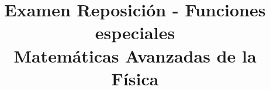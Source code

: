 
\marginsize{1cm}{1cm}{2cm}{2cm}
\pagestyle{fancy}
\fancyhf{}
\rfoot{\thepage}
\renewcommand{\headrulewidth}{0.5pt}
\setlength{\headheight}{30pt} 
\title{Examen Reposición - Funciones especiales \\ \large{Matemáticas Avanzadas de la Física}}
\date{ }

\vspace{-4cm}
\maketitle
\fontsize{14}{14}\selectfont
\begin{enumerate}
%     

\end{enumerate}
